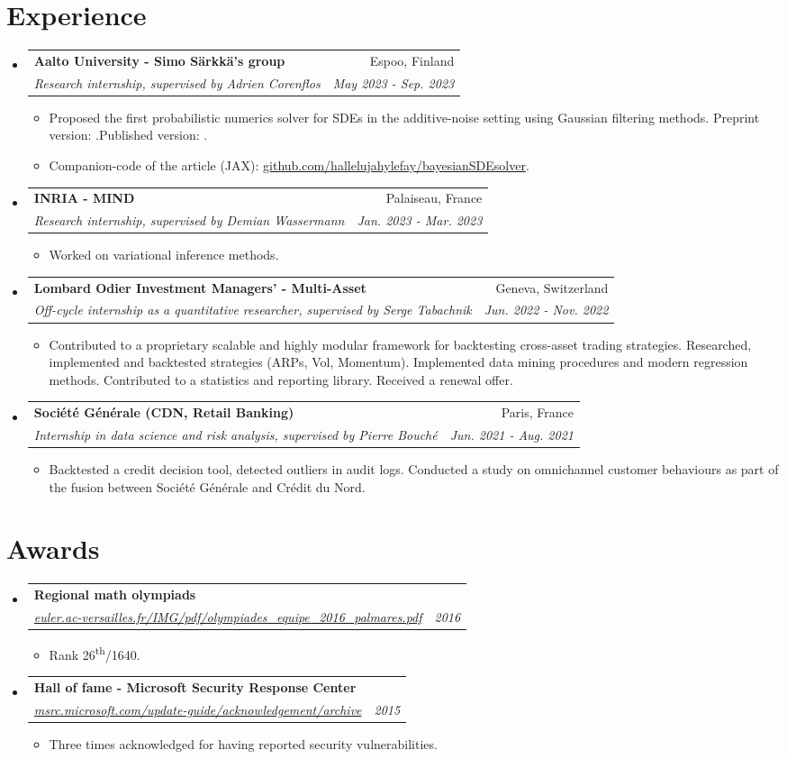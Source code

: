 \documentclass[letterpaper,10pt]{article}
\makeatletter
\newcommand{\up}[1]{\textsuperscript{#1}}
\newcommand{\resumeItem}[1]{
    \item\small{
            {#1 \vspace{-2pt}}
    }
}
\newcommand{\resumeSubheading}[4]{
    \vspace{-2pt}\item
    \begin{tabular*}{0.97\textwidth}[t]{l@{\extracolsep{\fill}}r}
        \textbf{#1}       & #2                 \\
        \textit{\small#3} & \textit{\small #4} \\
    \end{tabular*}\vspace{-7pt}
}
\newcommand{\resumeSubHeadingListStart}{\begin{itemize}[leftmargin=0.15in, label={}]}
\newcommand{\resumeSubHeadingListEnd}{\end{itemize}}
\newcommand{\resumeItemListStart}{\begin{itemize}}
\newcommand{\resumeItemListEnd}{\end{itemize}\vspace{-5pt}}
\makeatother
\begin{document}
\section{Experience}
\resumeSubHeadingListStart
\resumeSubheading
{Aalto University - Simo Särkkä's group}{Espoo, Finland}
{Research internship, supervised by Adrien Corenflos}{May 2023 - Sep. 2023}
\resumeItemListStart
\resumeItem{Proposed the first probabilistic numerics solver for SDEs in the additive-noise setting using Gaussian filtering methods. Preprint version: .Published version: .}
\resumeItem{Companion-code of the article (JAX): \href{https://github.com/hallelujahylefay/bayesianSDEsolver}{github.com/hallelujahylefay/bayesianSDEsolver}.}
\resumeItemListEnd
\resumeSubheading
{INRIA - MIND}{Palaiseau, France}
{Research internship, supervised by Demian Wassermann}{Jan. 2023 - Mar. 2023}
\resumeItemListStart
\resumeItem{Worked on variational inference methods.}
\resumeItemListEnd
\resumeSubheading
{Lombard Odier Investment Managers' - Multi-Asset}{Geneva, Switzerland}
{Off-cycle internship as a quantitative researcher, supervised by Serge Tabachnik}{Jun. 2022 - Nov. 2022}
\resumeItemListStart
\resumeItem{Contributed to a proprietary scalable and highly modular framework for backtesting cross-asset trading strategies. Researched, implemented and backtested strategies (ARPs, Vol, Momentum). Implemented data mining procedures and modern regression methods. Contributed to a statistics and reporting library. Received a renewal offer.}
\resumeItemListEnd
\resumeSubheading
{Société Générale (CDN, Retail Banking)}{Paris, France}%
{Internship in data science and risk analysis, supervised by Pierre Bouché}{Jun. 2021 - Aug. 2021}
\resumeItemListStart
\resumeItem{Backtested a credit decision tool, detected outliers in audit logs. Conducted a study on omnichannel customer behaviours as part of the fusion between Société Générale and Crédit du Nord.}
\resumeItemListEnd
\resumeSubHeadingListEnd
\section{Awards}
\resumeSubHeadingListStart
\resumeSubheading
{Regional math olympiads}{}{\href{http://euler.ac-versailles.fr/IMG/pdf/olympiades_equipe_2016_palmares.pdf}{euler.ac-versailles.fr/IMG/pdf/olympiades\_equipe\_2016\_palmares.pdf}}{2016}
\resumeItemListStart
\resumeItem{Rank 26\up{th}/1640.}
\resumeItemListEnd
\resumeSubheading
{Hall of fame - Microsoft Security Response Center}{}{\href{https://msrc.microsoft.com/update-guide/acknowledgement/archive}{msrc.microsoft.com/update-guide/acknowledgement/archive}}{2015}
\resumeItemListStart
\resumeItem{Three times acknowledged for having reported security vulnerabilities.}
\resumeItemListEnd
\resumeSubHeadingListEnd
\end{document}
